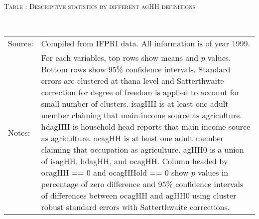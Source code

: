 \begin{minipage}[t]{14cm}
\hfil\textsc{\normalsize Table \thetable: Descriptive statistics by different agHH definitions\label{tab destat by agHH defs CRSE}}\\
\setlength{\tabcolsep}{1pt}
\renewcommand{\arraystretch}{.70}
\hfil{}\\
\renewcommand{\arraystretch}{.7}
\setlength{\tabcolsep}{1pt}
\begin{tabular}{>{\hfill\scriptsize}p{1cm}<{}>{\scriptsize}p{12cm}<{\hfill}}
Source:& Compiled from IFPRI data. All information is of year 1999.\\
Notes: & For each variables, top rows show means and $p$ values. Bottom rows show 95\% confidence intervals. Standard errors are clustered at thana level and Satterthwaite correction for degree of freedom is applied to account for small number of clusters. \textsf{isagHH} is at least one adult member claiming that main income source as agriculture. \textsf{hdagHH} is household head reports that main income source as agriculture. \textsf{ocagHH} is at least one adult member claiming that occupation as agriculture. \textsf{agHH0} is a union of \textsf{isagHH}, \textsf{hdagHH}, and \textsf{ocagHH}. Column headed by \textsf{ocagHH == 0} and \textsf{ocagHHold == 0} show $p$ values in percentage of zero difference and 95\% confidence intervals of differences between \textsf{ocagHH} and \textsf{agHH0} using cluster robust standard errors with Satterthwaite corrections.
\end{tabular}
\end{minipage}\\ \vspace{2ex}


